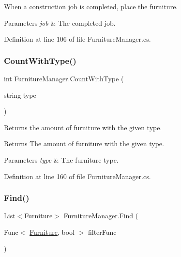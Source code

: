 When a construction job is completed, place the furniture. 


\begin{DoxyParams}{Parameters}
{\em job} & The completed job.\\
\hline
\end{DoxyParams}


Definition at line 106 of file Furniture\+Manager.\+cs.

\mbox{\label{class_furniture_manager_a70313492579a8ea148e6f44801295c12}} 
\subsubsection{\texorpdfstring{Count\+With\+Type()}{CountWithType()}}
{\footnotesize\ttfamily int Furniture\+Manager.\+Count\+With\+Type (\begin{DoxyParamCaption}\item[{string}]{type }\end{DoxyParamCaption})}



Returns the amount of furniture with the given type. 

\begin{DoxyReturn}{Returns}
The amount of furniture with the given type.
\end{DoxyReturn}

\begin{DoxyParams}{Parameters}
{\em type} & The furniture type.\\
\hline
\end{DoxyParams}


Definition at line 160 of file Furniture\+Manager.\+cs.

\mbox{\label{class_furniture_manager_a51c4836f1c5143937591e7ba2bbf5421}} 
\subsubsection{\texorpdfstring{Find()}{Find()}}
{\footnotesize\ttfamily List$<$\hyperlink{class_furniture}{Furniture}$>$ Furniture\+Manager.\+Find (\begin{DoxyParamCaption}\item[{Func$<$ \hyperlink{class_furniture}{Furniture}, bool $>$}]{filter\+Func }\end{DoxyParamCaption})}



